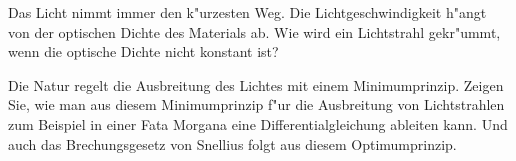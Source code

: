 \begin{aufgabe}
Das Licht nimmt immer den k"urzesten Weg.
Die Lichtgeschwindigkeit
h"angt von der optischen Dichte des Materials ab.
Wie wird ein Lichtstrahl gekr"ummt, wenn die optische Dichte
nicht konstant ist?
\end{aufgabe}

{\parindent 0pt Die Natur regelt die Ausbreitung des Lichtes mit einem
Minimumprinzip.} Zeigen Sie, wie man aus diesem Minimumprinzip
f"ur die Ausbreitung von Lichtstrahlen zum Beispiel in einer Fata Morgana
eine Differentialgleichung ableiten kann. Und auch das
Brechungsgesetz von Snellius folgt aus diesem Optimumprinzip.
